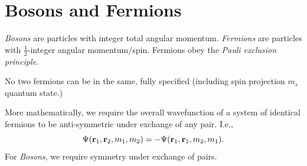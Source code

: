 \documentclass{book}
\begin{document}
\section{Bosons and Fermions}
\textit{Bosons} are particles with integer total angular momentum. \textit{Fermions} are particles with $\frac{1}{2}$-integer angular momentum/spin. Fermions obey the \textit{Pauli exclusion principle}.
\begin{tcolorbox}[colback=blue!5!white,colframe=blue!75!black,width=\textwidth,fonttitle=\bfseries, title={Pauli Exclusion Principle}]
	No two fermions can be in the same, fully specified (including spin projection $m_s$ quantum state.)
\end{tcolorbox}
More mathematically, we require the overall wavefunction of a system of identical fermions to be anti-symmetric under exchange of any pair. I.e.,
\begin{equation}
	\Psi(\vb{r}_1,\vb{r}_2,m_1,m_2) = - \Psi(\vb{r}_1,\vb{r}_1, m_2, m_1).
\end{equation}
For \textit{Bosons}, we require symmetry under exchange of pairs.
\end{document}
